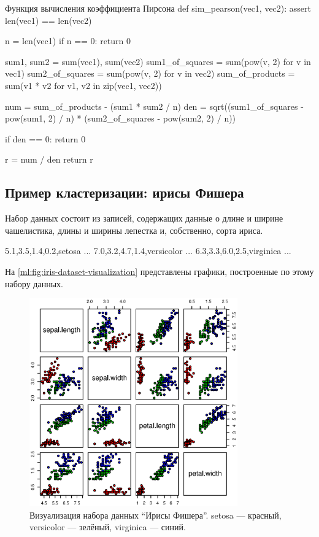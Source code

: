 \begin{pylst}{Функция вычисления коэффициента Пирсона}{}
def sim_pearson(vec1, vec2):
    assert len(vec1) == len(vec2)

    n = len(vec1)
    if n == 0:
        return 0

    sum1, sum2 = sum(vec1), sum(vec2)
    sum1_of_squares = sum(pow(v, 2) for v in vec1)
    sum2_of_squares = sum(pow(v, 2) for v in vec2)
    sum_of_products = sum(v1 * v2 for v1, v2 in zip(vec1, vec2))

    num = sum_of_products - (sum1 * sum2 / n)
    den = sqrt((sum1_of_squares - pow(sum1, 2) / n) *
               (sum2_of_squares - pow(sum2, 2) / n))

    if den == 0:
        return 0

    r = num / den
    return r
\end{pylst}

\subsection{Пример кластеризации: ирисы Фишера}
Набор данных состоит из записей, содержащих данные о длине и ширине чашелистика, длины и ширины лепестка и, собственно, сорта ириса.
\begin{plainlst}{}{}
5.1,3.5,1.4,0.2,setosa
...
7.0,3.2,4.7,1.4,versicolor
...
6.3,3.3,6.0,2.5,virginica
...
\end{plainlst}

На \autoref{ml:fig:iris-dataset-visualization} представлены графики, построенные по этому набору данных.

\begin{figure}[htb]
  \begin{center}
    \leavevmode
    \includegraphics[width=0.8\textwidth]{images/ml/iris-flower-dataset}
  \end{center}
  \caption{Визуализация набора данных ``Ирисы Фишера''. setosa — красный, versicolor — зелёный, virginica — синий.}
  \label{ml:fig:iris-dataset-visualization}
\end{figure}
